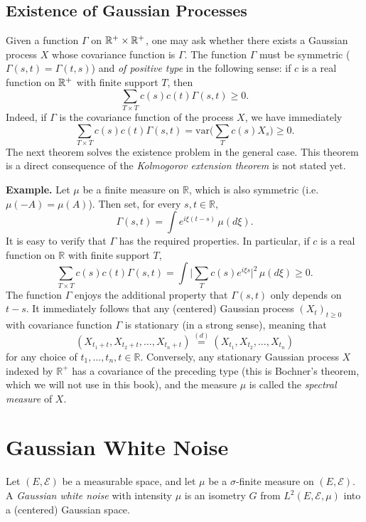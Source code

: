 \documentclass[../Main.tex]{subfiles}
\begin{document}
\subsection{Existence of Gaussian Processes}
Given a function $\Gamma$ on $\mathbb{R}^+\times \mathbb{R}^+$, one may ask whether there exists a Gaussian process $X$ whose covariance function is $\Gamma$. The function $\Gamma$ must be symmetric ($\Gamma(s,t)=\Gamma(t,s)$) and \emph{of positive type} in the following sense: if $c$ is a real function on $\mathbb{R}^+$ with finite support $T$, then
\[ \sum_{T\times T} c(s)c(t)\Gamma(s,t) \geq 0. \]
Indeed, if $\Gamma$ is the covariance function of the process $X$, we have immediately
\[ \sum_{T\times T} c(s)c(t)\Gamma(s,t) = \mathrm{var}\Big(\sum_T c(s)X_s\Big) \geq 0. \]
The next theorem solves the existence problem in the general case. This theorem is a direct consequence of the \textit{Kolmogorov extension theorem} is not stated yet.

\noindent\textbf{Example.} Let $\mu$ be a finite measure on $\mathbb R$, which is also symmetric (i.e.\ $\mu(-A)=\mu(A)$). Then set, for every $s,t\in\mathbb R$,
\[ \Gamma(s,t) = \int e^{i\xi(t-s)}\,\mu(d\xi). \]
It is easy to verify that $\Gamma$ has the required properties. In particular, if $c$ is a real function on $\mathbb R$ with finite support $T$,
\[ \sum_{T\times T} c(s)c(t)\Gamma(s,t) = \int \Big|\sum_{T} c(s)e^{i\xi s}\Big|^2\,\mu(d\xi) \geq 0. \]
The function $\Gamma$ enjoys the additional property that $\Gamma(s,t)$ only depends on $t-s$. It immediately follows that any (centered) Gaussian process $(X_t)_{t\geq 0}$ with covariance function $\Gamma$ is stationary (in a strong sense), meaning that
\[ (X_{t_1+t},X_{t_2+t},\dots,X_{t_n+t}) \overset{(d)}{=} (X_{t_1},X_{t_2},\dots,X_{t_n}) \]
for any choice of $t_1,\dots,t_n,t\in\mathbb R$. Conversely, any stationary Gaussian process $X$ indexed by $\mathbb R^+$ has a covariance of the preceding type (this is Bochner's theorem, which we will not use in this book), and the measure $\mu$ is called the \emph{spectral measure} of $X$.

\section{Gaussian White Noise}
Let $(E,\mathcal E)$ be a measurable space, and let $\mu$ be a $\sigma$-finite measure on $(E,\mathcal E)$. A \emph{Gaussian white noise} with intensity $\mu$ is an isometry $G$ from $L^2(E,\mathcal E,\mu)$ into a (centered) Gaussian space.
\end{document}

